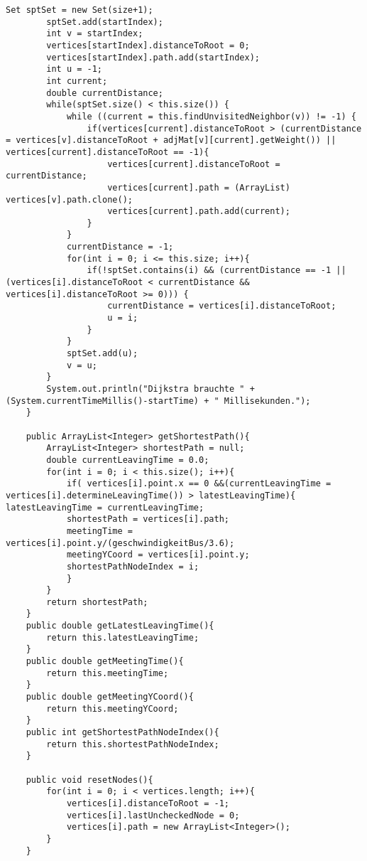 \documentclass[a4paper,10pt,ngerman]{scrartcl}
\begin{document}
\begin{lstlisting}[frame=single]
        Set sptSet = new Set(size+1);
        sptSet.add(startIndex);
        int v = startIndex;
        vertices[startIndex].distanceToRoot = 0;
        vertices[startIndex].path.add(startIndex);
        int u = -1;
        int current;
        double currentDistance;
        while(sptSet.size() < this.size()) {
            while ((current = this.findUnvisitedNeighbor(v)) != -1) {
                if(vertices[current].distanceToRoot > (currentDistance = vertices[v].distanceToRoot + adjMat[v][current].getWeight()) || vertices[current].distanceToRoot == -1){
                    vertices[current].distanceToRoot = currentDistance;
                    vertices[current].path = (ArrayList) vertices[v].path.clone();
                    vertices[current].path.add(current);
                }
            }
            currentDistance = -1;
            for(int i = 0; i <= this.size; i++){
                if(!sptSet.contains(i) && (currentDistance == -1 || (vertices[i].distanceToRoot < currentDistance && vertices[i].distanceToRoot >= 0))) {
                    currentDistance = vertices[i].distanceToRoot;
                    u = i;
                }
            }
            sptSet.add(u);
            v = u;
        }
        System.out.println("Dijkstra brauchte " + (System.currentTimeMillis()-startTime) + " Millisekunden.");
    }

    public ArrayList<Integer> getShortestPath(){
        ArrayList<Integer> shortestPath = null;
        double currentLeavingTime = 0.0;
        for(int i = 0; i < this.size(); i++){
            if( vertices[i].point.x == 0 &&(currentLeavingTime = vertices[i].determineLeavingTime()) > latestLeavingTime){ latestLeavingTime = currentLeavingTime;
            shortestPath = vertices[i].path;
            meetingTime = vertices[i].point.y/(geschwindigkeitBus/3.6);
            meetingYCoord = vertices[i].point.y;
            shortestPathNodeIndex = i;
            }
        }
        return shortestPath;
    }
    public double getLatestLeavingTime(){
        return this.latestLeavingTime;
    }
    public double getMeetingTime(){
        return this.meetingTime;
    }
    public double getMeetingYCoord(){
        return this.meetingYCoord;
    }
    public int getShortestPathNodeIndex(){
        return this.shortestPathNodeIndex;
    }

    public void resetNodes(){
        for(int i = 0; i < vertices.length; i++){
            vertices[i].distanceToRoot = -1;
            vertices[i].lastUncheckedNode = 0;
            vertices[i].path = new ArrayList<Integer>();
        }
    }


\end{lstlisting}
\end{document}
